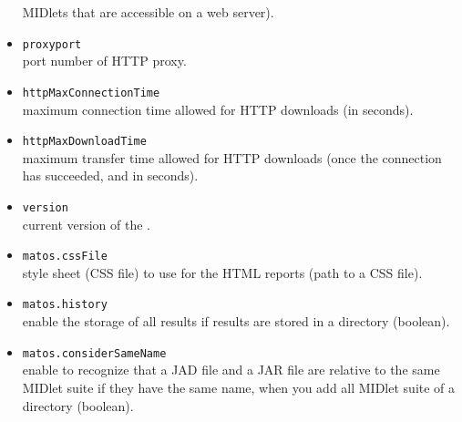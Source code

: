 \begin{itemize}
  MIDlets that are accessible on a web server).
\item{\texttt{proxyport}}\\ port number of HTTP proxy. 
\item{\texttt{httpMaxConnectionTime}}\\ maximum connection time allowed for HTTP
  downloads (in seconds).
\item{\texttt{httpMaxDownloadTime}}\\ maximum transfer time allowed for HTTP
  downloads (once the connection has succeeded, and in seconds).
\item{\texttt{version}}\\ current version of the \ma.
\item{\texttt{matos.cssFile}}\\ style sheet (CSS file) to use for the HTML
  reports (path to a CSS file).
\item{\texttt{matos.history}}\\ enable the storage of all results if results are
  stored in a directory (boolean).
\item{\texttt{matos.considerSameName}}\\ enable to recognize that a JAD file and a JAR
  file are relative to the same MIDlet suite if they have the same name, when
  you add all MIDlet suite of a directory (boolean). 
\end{itemize}
